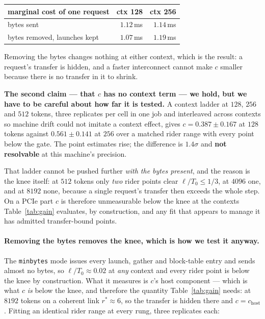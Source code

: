 \begin{center}\small
\begin{tabular}{lrr}
\toprule
marginal cost of one request & ctx 128 & ctx 256 \\
\midrule
bytes sent & $1.12$\,ms & $1.14$\,ms \\
bytes removed, launches kept & $1.07$\,ms & $1.19$\,ms \\
\bottomrule
\end{tabular}
\end{center}

Removing the bytes changes nothing at either context, which is the result: a
request's transfer is hidden, and a faster interconnect cannot make $c$ smaller
because there is no transfer in it to shrink.

\textbf{The second claim --- that $c$ has no context term --- we hold, but we have
to be careful about how far it is tested.} A context ladder at $128$, $256$ and
$512$ tokens, three replicates per cell in one job and interleaved across contexts
so machine drift could not imitate a context effect, gives $c = 0.387 \pm 0.167$ at
$128$ tokens against $0.561 \pm 0.141$ at $256$ over a matched rider range with
every point below the gate. The point estimates rise; the difference is
$1.4\sigma$ and \textbf{not resolvable} at this machine's precision.

That ladder cannot be pushed further \emph{with the bytes present}, and the reason
is the knee itself: at $512$ tokens only \emph{two} rider points clear
$\ell/T_0 \le 1/3$, at $4096$ one, and at $8192$ none, because a single request's
transfer then exceeds the whole step. On a PCIe part $c$ is therefore unmeasurable
below the knee at the contexts Table~\ref{tab:gain} evaluates, by construction, and
any fit that appears to manage it has admitted transfer-bound points.

\paragraph{Removing the bytes removes the knee, which is how we test it anyway.}
The \texttt{minbytes} mode issues every launch, gather and block-table entry and
sends almost no bytes, so $\ell/T_0 \approx 0.02$ at \emph{any} context and every
rider point is below the knee by construction. What it measures is $c$'s host
component --- which is what $c$ \emph{is} below the knee, and therefore the quantity
Table~\ref{tab:gain} needs: at $8192$ tokens on a coherent link
$r^{*} \approx 6$, so the transfer is hidden there and $c = c_{\mathrm{host}}$.
Fitting an identical rider range at every rung, three replicates each:

